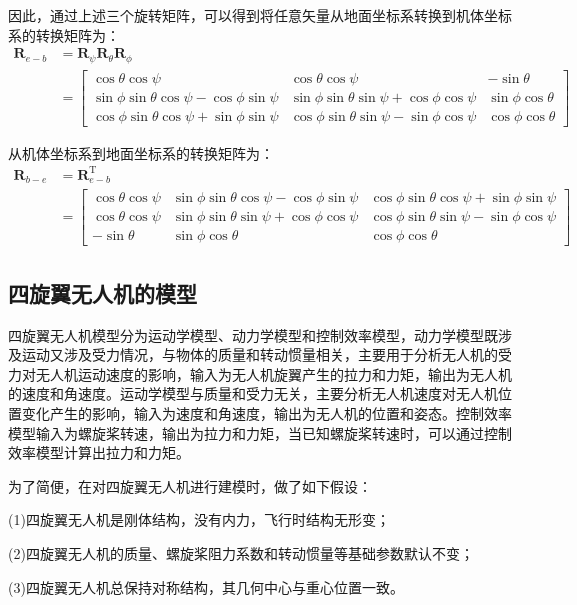 \documentclass[lang=chs, degree=master, blindreview=true, winfonts=true]{yanputhesis}
\begin{document}
因此，通过上述三个旋转矩阵，可以得到将任意矢量从地面坐标系转换到机体坐标系的转换矩阵为：
$$\begin{aligned}\boldsymbol{R}_{e-b}&=\boldsymbol{R}_{\psi}\boldsymbol{R}_{\theta}\boldsymbol{R}_{\phi}\\&=\begin{bmatrix}\cos\theta\cos\psi&\cos\theta\cos\psi&-\sin\theta\\\sin\phi\sin\theta\cos\psi-\cos\phi\sin\psi&\sin\phi\sin\theta\sin\psi+\cos\phi\cos\psi&\sin\phi\cos\theta\\\cos\phi\sin\theta\cos\psi+\sin\phi\sin\psi&\cos\phi\sin\theta\sin\psi-\sin\phi\cos\psi&\cos\phi\cos\theta\end{bmatrix}\end{aligned}$$

从机体坐标系到地面坐标系的转换矩阵为：
$$\begin{aligned}\boldsymbol{R}_{b-e}&=\bm{R}_{e-b}^\mathrm{T}\\&=\begin{bmatrix}\cos\theta\cos\psi&\sin\phi\sin\theta\cos\psi-\cos\phi\sin\psi&\cos\phi\sin\theta\cos\psi+\sin\phi\sin\psi\\\cos\theta\cos\psi&\sin\phi\sin\theta\sin\psi+\cos\phi\cos\psi&\cos\phi\sin\theta\sin\psi-\sin\phi\cos\psi\\-\sin\theta&\sin\phi\cos\theta&\cos\phi\cos\theta\end{bmatrix}\end{aligned}$$

\subsection{四旋翼无人机的模型}
四旋翼无人机模型分为运动学模型、动力学模型和控制效率模型，动力学模型既涉及运动又涉及受力情况，与物体的质量和转动惯量相关，主要用于分析无人机的受力对无人机运动速度的影响，输入为无人机旋翼产生的拉力和力矩，输出为无人机的速度和角速度。运动学模型与质量和受力无关，主要分析无人机速度对无人机位置变化产生的影响，输入为速度和角速度，输出为无人机的位置和姿态。控制效率模型输入为螺旋桨转速，输出为拉力和力矩，当已知螺旋桨转速时，可以通过控制效率模型计算出拉力和力矩。

为了简便，在对四旋翼无人机进行建模时，做了如下假设：

(1)四旋翼无人机是刚体结构，没有内力，飞行时结构无形变；

(2)四旋翼无人机的质量、螺旋桨阻力系数和转动惯量等基础参数默认不变；

(3)四旋翼无人机总保持对称结构，其几何中心与重心位置一致。
\end{document}
